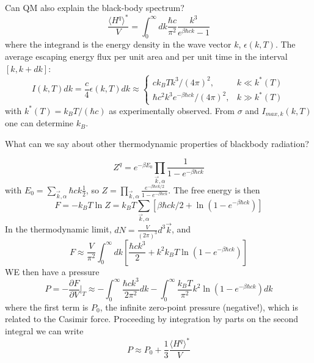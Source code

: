 \documentclass[12pt, a4paper, oneside, openright, titlepage]{book}
\begin{document}
Can QM also explain the black-body spectrum? \begin{equation*}
    \frac{\langle H^q\rangle^*}{V} = \int_0^{\infty}dk\frac{\hbar c}{\pi^2}\frac{k^3}{e^{\beta\hbar ck}-1}
\end{equation*}
where the integrand is the energy density in the wave vector $k$, $\epsilon(k,T)$. The average escaping energy flux per unit area and per unit time in the interval $[k,k+dk]$: \begin{equation*}
    I(k,T)dk = \frac{c}{4}\epsilon(k,T)dk \approx \left\{\begin{array}{cc} ck_BTk^3/(4\pi)^2,& k\ll k^*(T) \\ \hbar c^2k^3e^{-\beta\hbar ck}/(4\pi)^2,& k\gg k^*(T) \end{array}\right.
\end{equation*}
with $k^*(T) = k_BT/(\hbar c)$ as experimentally observed. From $\sigma$ and $I_{max,k}(k,T)$ one can determine $k_B$.

What can we say about other thermodynamic properties of blackbody radiation?

\begin{equation*}
    Z^q = e^{-\beta E_0}\prod_{\vec{k},\alpha}\frac{1}{1-e^{-\beta\hbar ck}}
\end{equation*}
with $E_0 = \sum_{\vec{k},\alpha}\hbar ck\frac{1}{2}$, so $Z = \prod_{\vec{k},\alpha}\frac{e^{-\beta\hbar ck/2}}{1-e^{-\beta\hbar ck}}$. The free energy is then \begin{equation*}
    F = -k_BT\ln Z = k_BT\sum_{\vec{k},\alpha}\left[\beta\hbar ck/2+\ln(1-e^{-\beta \hbar ck})\right]
\end{equation*}
In the thermodynamic limit, $dN = \frac{V}{(2\pi)^3}d^3\vec{k}$, and \begin{equation*}
    F \approx \frac{V}{\pi^2}\int_0^{\infty}dk\left[\frac{\hbar ck^3}{2}+k^2k_BT\ln(1-e^{-\beta \hbar ck})\right]
\end{equation*}
WE then have a pressure \begin{equation*}
    P = -\frac{\partial F}{\partial V}\Bigg\rvert_T \approx -\int_0^{\infty}\frac{\hbar ck^3}{2\pi^2}dk - \int_0^{\infty}\frac{k_BT}{\pi^2}k^2\ln(1-e^{-\beta \hbar ck})dk
\end{equation*}
where the first term is $P_0$, the infinite zero-point pressure (negative!), which is related to the Casimir force. Proceeding by integration by parts on the second integral we can write \begin{equation*}
    P\approx P_0+\frac{1}{3}\frac{\langle H^q\rangle^*}{V}
\end{equation*}
\end{document}
